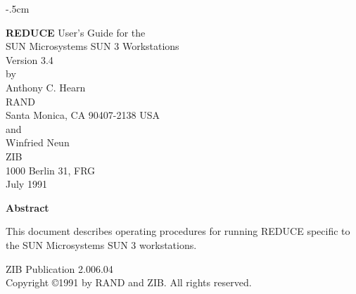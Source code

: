 \hoffset -.5cm
\parindent 0pt
\parskip 6pt
\pagestyle{empty}
\setlength{\topsep}{0.5\baselineskip}  %
\setlength{\itemsep}{\topsep}
\setlength{\abovedisplayskip}{\topsep}  %
\setlength{\belowdisplayskip}{\topsep}

\renewcommand{\arraystretch}{1.3}
\renewcommand{\thechapter}{\arabic{chapter}}
\renewcommand{\thesection}{\arabic{section}.}
\renewcommand{\thesubsection}{\arabic{subsection}.}
\newcommand{\REDUCE}{REDUCE}


\newcommand{\zibnumber}{2.006.04}
\newcommand{\system}{SUN Microsystems SUN 3}
\newcommand{\programsize}{3.5}      %
\newcommand{\virtualsize}{128}      %
\newcommand{\timingmachine}{SUN-3/60}
\newcommand{\machinefactors}{Sun-3/50     &1.5
			  \\ Sun-3/260    &0.8
                          \\ Sun-3/75     &1.5
                          \\ Sun-3/160    &1.5
                          \\ Sun-3/180    &1.5}
\newcommand{\cartridgecommand}{tar xb 126}
\newcommand{\tapespace}{22}        %
\newcommand{\createtime}{21}        %
\newcommand{\executablespace}{2.5}  %
\newcommand{\testtime}{20.4}        %
\newcommand{\floatingpointdigits}{12}


\vspace*{1cm}
\begin{center}
{\LARGE {\bf REDUCE} User's Guide  for the } \vspace*{2mm} \\
{\LARGE {\system} Workstations} \\
\vspace*{.5cm}
{\LARGE Version 3.4} \\[0.3cm]
{\large by} \\[0.3cm]
{\Large Anthony C. Hearn}\\
{\large RAND} \\
{\large Santa Monica, CA 90407-2138 USA} \\[0.3cm]
{\large and} \\[0.3cm]
{\Large Winfried Neun}\\
{\large ZIB} \\
{\large 1000 Berlin 31, FRG} \\[0.3cm]
{\large July 1991}\\[0.5cm]
\vfill

{\bf Abstract}
\end{center}
This document describes operating procedures for running {\REDUCE}
specific to the {\system} workstations.
\begin{center}
{ZIB  Publication {\zibnumber}} \\
\vspace*{1cm}
Copyright \copyright 1991 by RAND and ZIB.  All rights reserved.
\end{center}


